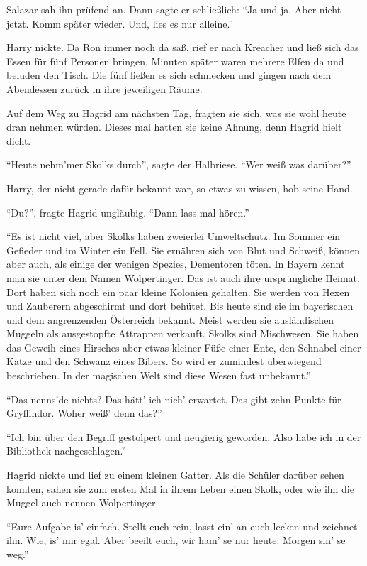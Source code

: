 Salazar sah ihn prüfend an. Dann sagte er schließlich: \enquote{Ja und ja. Aber nicht jetzt. Komm später wieder. Und, lies es nur alleine.}

Harry nickte. Da Ron immer noch da saß, rief er nach Kreacher und ließ sich das Essen für fünf Personen bringen. Minuten später waren mehrere Elfen da und beluden den Tisch. Die fünf ließen es sich schmecken und gingen nach dem Abendessen zurück in ihre jeweiligen Räume.

Auf dem Weg zu Hagrid am nächsten Tag, fragten sie sich, was sie wohl heute dran nehmen würden. Dieses mal hatten sie keine Ahnung, denn Hagrid hielt dicht.

\enquote{Heute nehm’mer Skolks durch}, sagte der Halbriese. \enquote{Wer weiß was darüber?}

Harry, der nicht gerade dafür bekannt war, so etwas zu wissen, hob seine Hand.

\enquote{Du?}, fragte Hagrid ungläubig. \enquote{Dann lass mal hören.}

\enquote{Es ist nicht viel, aber Skolks haben zweierlei Umweltschutz. Im Sommer ein Gefieder und im Winter ein Fell. Sie ernähren sich von Blut und Schweiß, können aber auch, als einige der wenigen Spezies, Dementoren töten. In Bayern kennt man sie unter dem Namen Wolpertinger. Das ist auch ihre ursprüngliche Heimat. Dort haben sich noch ein paar kleine Kolonien gehalten. Sie werden von Hexen und Zauberern abgeschirmt und dort behütet. Bis heute sind sie im bayerischen und dem angrenzenden Österreich bekannt. Meist werden sie ausländischen Muggeln als ausgestopfte Attrappen verkauft. Skolks sind Mischwesen. Sie haben das Geweih eines Hirsches \gst aber etwas kleiner \gst Füße einer Ente, den Schnabel einer Katze und den Schwanz eines Bibers. So wird er zumindest überwiegend beschrieben. In der magischen Welt sind diese Wesen fast unbekannt.}

\enquote{Das nenns’de  nichts? Das hätt’ ich nich’ erwartet. Das gibt zehn Punkte für Gryffindor. Woher weiß’ denn das?}

\enquote{Ich bin über den Begriff gestolpert und neugierig geworden. Also habe ich in der Bibliothek nachgeschlagen.}

Hagrid nickte und lief zu einem kleinen Gatter. Als die Schüler darüber sehen konnten, sahen sie zum ersten Mal in ihrem Leben einen Skolk, oder wie ihn die Muggel auch nennen Wolpertinger.

\enquote{Eure Aufgabe is’ einfach. Stellt euch rein, lasst ein’ an euch lecken und zeichnet ihn. Wie, is’ mir egal. Aber beeilt euch, wir ham’ se nur heute. Morgen sin’ se weg.}

